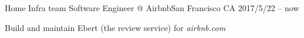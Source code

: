 


\begin{cventries}


\cventry
{Home Infra team}
{Software Engineer @ Airbnb}{San Francisco CA}
{2017/5/22 -- now}
{
  \begin{cvitems}
  \item Build and maintain Ebert (the review service) for \emph{airbnb.com}
  \end{cvitems}
}

\end{cventries}
